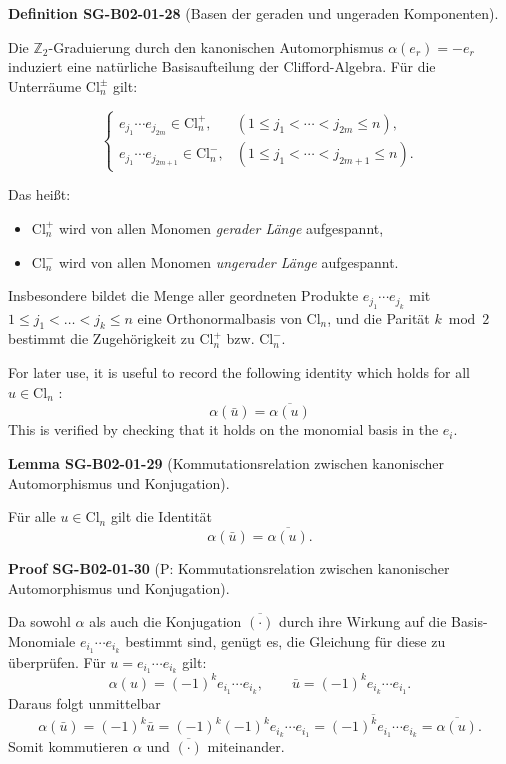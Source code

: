 \documentclass[10pt, letterpaper]{article}
\newcommand{\Cl}{\mathrm{Cl}}
\newcommand{\CustomHeading}[3]{%
  \par\medskip\noindent%
  \textbf{#1 #2} \textnormal{(#3)}.\enskip%
}
\newenvironment{DEF}[2]{\begin{unitbox}\CustomHeading{Definition}{#1}{#2}}{\end{unitbox}}
\newenvironment{LEM}[2]{\begin{unitbox}\CustomHeading{Lemma}{#1}{#2}}{\end{unitbox}}
\newenvironment{PROOF}[2]{\begin{unitbox}\CustomHeading{Proof}{#1}{#2}}{\end{unitbox}}
\begin{document}
\begin{DEF}{SG-B02-01-28}{Basen der geraden und ungeraden Komponenten}
Die $\mathbb{Z}_2$-Graduierung durch den kanonischen Automorphismus
\(\alpha(e_r)=-e_r\) induziert eine natürliche Basisaufteilung der Clifford-Algebra.
Für die Unterräume \(\Cl_n^\pm\) gilt:

\[
\begin{cases}
e_{j_1}\cdots e_{j_{2m}} \in \Cl_n^+,
& (1\le j_1<\cdots<j_{2m}\le n),\\[4pt]
e_{j_1}\cdots e_{j_{2m+1}} \in \Cl_n^-,
& (1\le j_1<\cdots<j_{2m+1}\le n).
\end{cases}
\]

Das heißt:
\begin{itemize}
  \item \(\Cl_n^+\) wird von allen Monomen \emph{gerader Länge} aufgespannt,
  \item \(\Cl_n^-\) wird von allen Monomen \emph{ungerader Länge} aufgespannt.
\end{itemize}
Insbesondere bildet die Menge aller geordneten Produkte
\(e_{j_1}\cdots e_{j_k}\) mit \(1\le j_1<\dots<j_k\le n\)
eine Orthonormalbasis von \(\Cl_n\),
und die Parität \(k\bmod 2\) bestimmt die Zugehörigkeit zu
\(\Cl_n^+\) bzw. \(\Cl_n^-\).
\end{DEF}


For later use, it is useful to record the following identity which holds for all $u \in \mathrm{Cl}_{n}$ :
$$
\alpha(\bar{u})=\overline{\alpha(u)}
$$
This is verified by checking that it holds on the monomial basis in the $e_{i}$.


\begin{LEM}{SG-B02-01-29}{Kommutationsrelation zwischen kanonischer Automorphismus und Konjugation}
Für alle $u \in \Cl_n$ gilt die Identität
\[
\alpha(\bar{u}) = \overline{\alpha(u)}.
\]
\end{LEM}


\begin{PROOF}{SG-B02-01-30}{P: Kommutationsrelation zwischen kanonischer Automorphismus und Konjugation}
Da sowohl $\alpha$ als auch die Konjugation $\overline{(\cdot)}$ durch ihre Wirkung auf die Basis-Monomiale $e_{i_1}\cdots e_{i_k}$ bestimmt sind, genügt es, die Gleichung für diese zu überprüfen.  
Für $u = e_{i_1}\cdots e_{i_k}$ gilt:
\[
\alpha(u) = (-1)^k e_{i_1}\cdots e_{i_k},
\qquad
\bar{u} = (-1)^k e_{i_k}\cdots e_{i_1}.
\]
Daraus folgt unmittelbar
\[
\alpha(\bar{u}) = (-1)^k \bar{u} = (-1)^k (-1)^k e_{i_k}\cdots e_{i_1}
= \overline{(-1)^k e_{i_1}\cdots e_{i_k}}
= \overline{\alpha(u)}.
\]
Somit kommutieren $\alpha$ und $\overline{(\cdot)}$ miteinander.
\end{PROOF}
\end{document}
